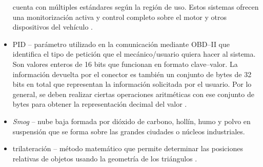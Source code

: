 \begin{itemize}
        cuenta con múltiples estándares según la región de uso. Estos
        sistemas ofrecen una monitorización activa y control completo
        sobre el motor y otros dispositivos del vehículo \cite{OBD2021}.
  \item \ac{PID} -- parámetro utilizado en la comunicación mediante \ac{OBD}--II que
        identifica el tipo de petición que el mecánico/usuario quiera hacer al sistema.
        Son valores enteros de 16 bits que funcionan en formato clave--valor. La información
        devuelta por el conector es también un conjunto de bytes de 32 bits en total que
        representan la información solicitada por el usuario. Por lo general, se deben
        realizar ciertas operaciones aritméticas con ese conjunto de bytes para obtener
        la representación decimal del valor \cite{OBDIIPIDs2021}.
  \item \textit{Smog} -- nube baja formada por dióxido de carbono, hollín, humo y polvo
        en suspensión que se forma sobre las grandes ciudades o núcleos industriales.
  \item trilateración -- método matemático que permite determinar las posiciones
        relativas de objetos usando la geometría de los triángulos \cite{Trilateracion2021}.
\end{itemize}
